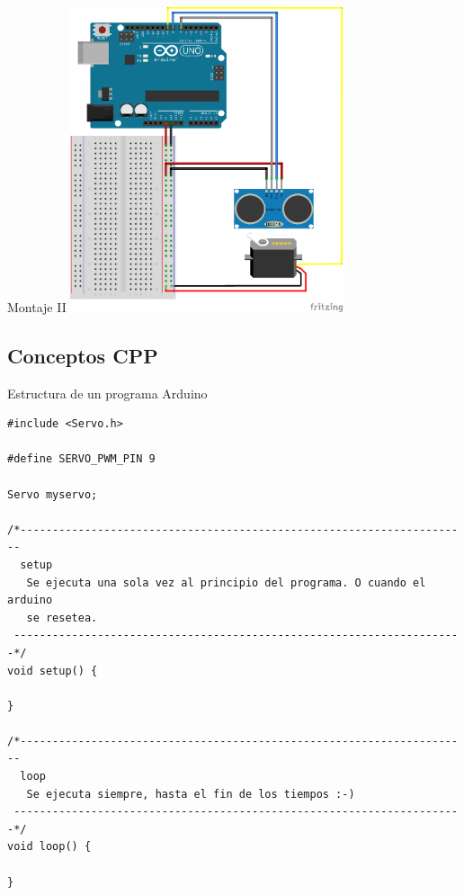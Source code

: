 \begin{frame}{Montaje II}
  \includegraphics [width=0.6\textwidth]{SODAR_diagrama.png}
\end{frame}

\subsection{Conceptos CPP}

\begin{frame}[fragile]{Estructura de un programa Arduino}

\begin{lstlisting}
#include <Servo.h>     

#define SERVO_PWM_PIN 9

Servo myservo;         

/*----------------------------------------------------------------------
  setup
   Se ejecuta una sola vez al principio del programa. O cuando el arduino
   se resetea.
 ----------------------------------------------------------------------*/
void setup() {
  
}

/*----------------------------------------------------------------------
  loop
   Se ejecuta siempre, hasta el fin de los tiempos :-)
 ----------------------------------------------------------------------*/
void loop() {

}
\end{lstlisting}

\end{frame}

